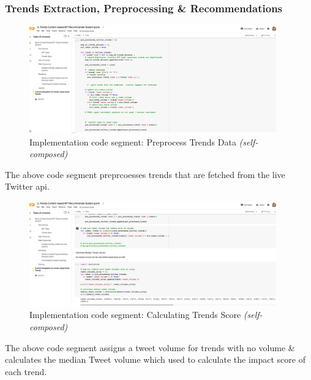 \subsubsection{Trends Extraction, Preprocessing \& Recommendations}
\begin{figure}[h!]
\centering
\includegraphics[width=0.95\textwidth]{images/Implementation/code/preprocessing trends.png}
\caption{Implementation code segment: Preprocess Trends Data \textit{(self-composed)}}
\label{fig:code-preprocess-trends}
\end{figure}

The above code segment preprcoesses trends that are fetched from the live Twitter \gls{api}.

\begin{figure}[h!]
\centering
\includegraphics[width=0.95\textwidth]{images/Implementation/code/tweet-volume calculation.png}
\caption{Implementation code segment: Calculating Trends Score \textit{(self-composed)}}
\label{fig:code-tweet-volume-extraction}
\end{figure}

The above code segment assigns a tweet volume for trends with no volume \& calculates the median Tweet volume which used to calculate the impact score of each trend.

